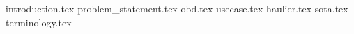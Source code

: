 {introduction.tex}
{problem_statement.tex}
{obd.tex}
{usecase.tex}
{haulier.tex}
{sota.tex}
{terminology.tex}
